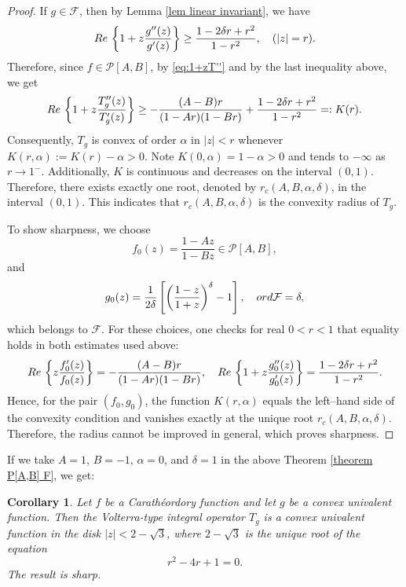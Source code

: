 \documentclass[12pt,a4paper]{amsart}
\numberwithin{equation}{section}
\newtheorem{corollary}{Corollary}[section]
\theoremstyle{remark}
\begin{document}
\begin{proof}
If $g\in \mathcal{F}$, then by Lemma \ref{lem linear invariant}, we have
\begin{equation*}
 {\rm Re}\,\left\{ 1 + z \frac{g''(z)}{g'(z)} \right\}\geq \frac{1-2\delta r+r^2}{1-r^2},\quad(|z|=r).   
\end{equation*}
Therefore, since $f\in\mathcal{P}[A,B]$, by \eqref{eq:1+zT''} and by the last inequality above, we get 
\begin{equation*}
{\rm Re}\,\left\{1 + z \frac{T_g''(z)}{T_g'(z)} \right\}\geq -\frac{(A-B)r}{(1-A r)(1-B r)}+\frac{1-2\delta r+r^2}{1-r^2}=:K(r).
\end{equation*}
Consequently, \(T_g\) is convex of order \(\alpha\) in \(|z|<r\) whenever $K(r,\alpha):=K(r)-\alpha>0$.
Note \(K(0,\alpha)=1-\alpha>0\) and tends to \(-\infty\) as \(r\to1^-\). Additionally, \(K\) is continuous and decreases on the interval \((0, 1)\). Therefore, there exists exactly one root, denoted by \(r_c(A, B, \alpha, \delta)\), in the interval \((0, 1)\). This indicates that \(r_c(A, B, \alpha, \delta)\) is the convexity radius of \(T_g\).

To show sharpness, we choose 
\[
f_0(z)=\frac{1-A z}{1-B z}\in\mathcal P[A,B],
\]
and 
\[
g_0(z)=\frac{1}{2\delta}\left[\left(\frac{1-z}{1+z}\right)^\delta-1\right],\quad {\rm ord}\mathcal F=\delta,
\]
which belongs to \(\mathcal F\). For these choices, one checks for real \(0<r<1\) that equality holds in both estimates used above:
\[
{\rm Re}\,\left\{ z\frac{f_0'(z)}{f_0(z)}\right\}= -\frac{(A-B)r}{(1-Ar)(1-Br)}, \quad 
{\rm Re}\,\left\{1+z\frac{g_0''(z)}{g_0'(z)}\right\}=\frac{1-2\delta r + r^2}{1-r^2}.
\]
Hence, for the pair \((f_0,g_0)\), the function \(K(r,\alpha)\) equals the left–hand side of the convexity condition and vanishes exactly at the unique root \(r_c(A,B,\alpha,\delta)\). Therefore, the radius cannot be improved in general, which proves sharpness.
\end{proof}
If we take $A=1$, $B=-1$, $\alpha=0$, and $\delta=1$ in the above Theorem \ref{theorem P[A,B] F}, we get:
\begin{corollary}  
Let $f$ be a Carath\'eordory function and let $g$ be a convex univalent function. Then the Volterra-type integral operator $T_g$ is a convex univalent function in the disk $|z|<2-\sqrt{3}$, where \(2-\sqrt{3}\) is the unique root of the equation
\begin{equation*}
r^2 - 4r+1=0.
\end{equation*}
The result is sharp.
\end{corollary}
\end{document}
